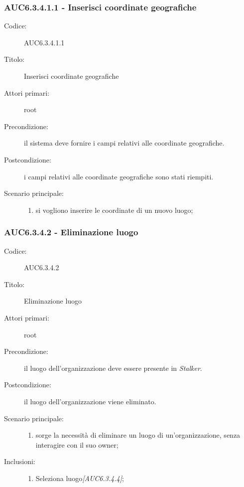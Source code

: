 \documentclass[casi-duso]{subfiles}
\begin{document}
\subsubsection{AUC6.3.4.1.1 - Inserisci coordinate geografiche}%
\label{subsub:AUC6.3.4.1.1}
\begin{description}
  \item[Codice:] AUC6.3.4.1.1
  \item[Titolo:] Inserisci coordinate geografiche
  \item[Attori primari:] root
  \item[Precondizione:] il sistema deve fornire i campi relativi alle coordinate geografiche.
  \item[Postcondizione:] i campi relativi alle coordinate geografiche sono stati riempiti.
  \item[Scenario principale:]
  \begin{enumerate}
    \item si vogliono inserire le coordinate di un nuovo luogo;
  \end{enumerate}
\end{description}

\subsubsection{AUC6.3.4.2 - Eliminazione luogo}%
\label{subsub:AUC6.3.4.2}
\begin{description}
  \item[Codice:] AUC6.3.4.2
  \item[Titolo:] Eliminazione luogo
  \item[Attori primari:] root
  \item[Precondizione:] il luogo dell'organizzazione deve essere presente in \emph{Stalker}.
  \item[Postcondizione:] il luogo dell'organizzazione viene eliminato.
  \item[Scenario principale:]
  \begin{enumerate}
    \item sorge la necessità di eliminare un luogo di un'organizzazione, senza interagire con il suo owner;
  \end{enumerate}
  \item[Inclusioni:]
  \begin{enumerate}
    \item Seleziona luogo\emph{[AUC6.3.4.4]};
  \end{enumerate}
\end{description}
\end{document}
